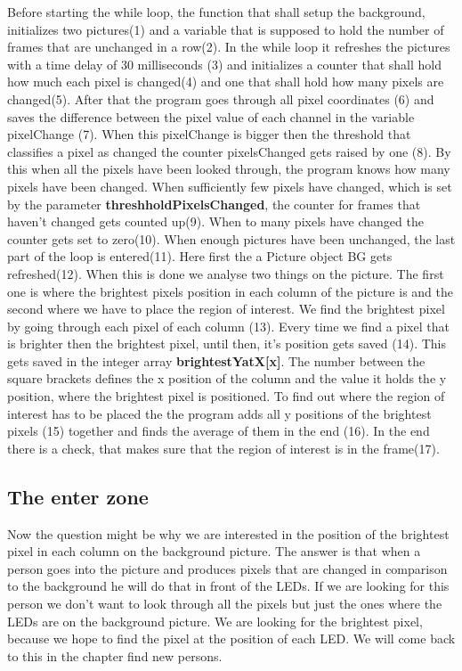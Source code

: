 Before starting the while loop, the function that shall setup the background, initializes two pictures(1) and a variable that is supposed to hold the number of frames that are unchanged in a row(2). In the while loop it refreshes the pictures with a time delay of 30 milliseconds (3) and initializes a counter that shall hold how much each pixel is changed(4) and one that shall hold how many pixels are changed(5). After that the program goes through all pixel coordinates (6) and saves the difference between the pixel value of each channel in the variable pixelChange (7). When this pixelChange is bigger then the threshold that classifies a pixel as changed the counter pixelsChanged gets raised by one (8). By this when all the pixels have been looked through, the program knows how many pixels have been changed. When sufficiently few pixels have changed, which is set by the parameter \textbf{threshholdPixelsChanged}, the counter for frames that haven't changed gets counted up(9). When to many pixels have changed the counter gets set to zero(10). 
When enough pictures have been unchanged, the last part of the loop is entered(11). Here first the a Picture object BG gets refreshed(12). When this is done we analyse two things on the picture. The first one is where the brightest pixels position in each column of the picture is and the second where we have to place the region of interest. We find the brightest pixel by going through each pixel of each column (13). Every time we find a pixel that is brighter then the brightest pixel, until then, it's position gets saved (14). This gets saved in the integer array \textbf{brightestYatX[x]}. The number between the square brackets defines the x position of the column and the value it holds the y position, where the brightest pixel is positioned. To find out where the region of interest has to be placed the the program adds all y positions of the brightest pixels (15) together and finds the average of them in the end (16). In the end there is a check, that makes sure that the region of interest is in the frame(17).

\subsection{The enter zone}
Now the question might be why we are interested in the position of the brightest pixel in each column on the background picture. The answer is that when a person goes into the picture and produces pixels that are changed in comparison to the background he will do that in front of the LEDs. If we are looking for this person we don't want to look through all the pixels but just the ones where the LEDs are on the background picture. We are looking for the brightest pixel, because we hope to find the pixel at the position of each LED. We will come back to this in the chapter find new persons. 

